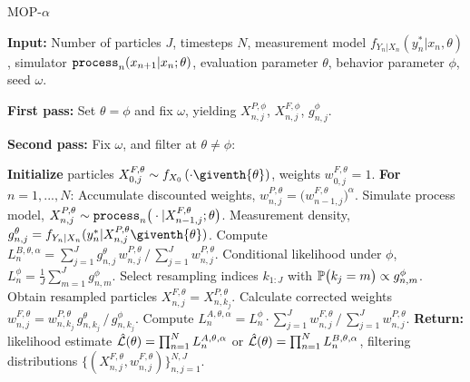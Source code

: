 \documentclass[9pt,twocolumn,pnasresearcharticle]{pnas-new}
\begin{document}
\begin{algorithm}[H]
	\caption{MOP-$\alpha$}
    \label{alg:mop}
	     \textbf{Input:} Number of particles $J$, timesteps $N$, measurement model $f_{Y_n|X_n}(y_n^*|x_n, \theta)$, simulator $\texttt{process}_n(x_{n+1}|x_n; \theta)$, evaluation parameter $\theta$, behavior parameter $\phi$, seed $\omega$.
      
        \textbf{First pass:} Set $\theta=\phi$ and fix $\omega$, yielding $X_{n,j}^{P,\phi}$, $X_{n,j}^{F,\phi}$, $g^{\phi}_{n,j}$.
            
        \textbf{Second pass:}
        Fix $\omega$, and filter at $\theta\neq \phi$:
            
		\textbf{Initialize } particles ${X}_{0,j}^{F,\theta}\sim {f}_{{X}_{0}}\left(\cdot\giventh{\theta}\right)$, weights $w^{F,\theta}_{0,j}= 1$. \newline
		\textbf{For} $n=1,...,N$: \newline
            \hspace*{4mm} Accumulate discounted weights, $w_{n,j}^{P,\theta} = \big(w_{n-1,j}^{F,\theta}\big)^\alpha$.\newline
            \hspace*{4mm} Simulate process model,
            ${X}_{n,j}^{P,\theta}\sim \texttt{process}_n\big(\cdot|{X}_{n-1,j}^{F, \theta};{\theta}\big)$. \newline
            \hspace*{4mm} Measurement density,
            $g^{\theta}_{n,j}={f}_{{Y}_{n}|{X}_{n}}(y_{n}^{*}|{X}_{n,j}^{P,\theta}\giventh{\theta})$. \newline
            \hspace*{4mm} Compute $L_n^{B,\theta,\alpha} ={\sum_{j=1}^Jg^\theta_{n,j} \, w^{P,\theta}_{n,j}}\, \big/\, {\sum_{j=1}^J  w^{P,\theta}_{n,j}}$. \newline
            \hspace*{4mm} Conditional likelihood under $\phi$,
            $L_n^{\phi} = \frac{1}{J}\sum_{m=1}^{J}g^{\phi}_{n,m}$.\newline
            \hspace*{4mm} Select resampling indices $k_{1:J}$ with $\mathbb{P}\big(k_{j}=m\big) \propto g^{\phi}_{n,m}$. \newline
            \hspace*{4mm} Obtain resampled particles ${X}_{n,j}^{F,\theta}={X}_{n,k_{j}}^{P,\theta}$. \newline
            \hspace*{4mm} Calculate corrected weights
            $w_{n,j}^{F,\theta}= w^{P,\theta}_{n,k_j} \, g^{\theta}_{n,k_j} \, \big/ \, { g^{\phi}_{n,k_j}}$.\newline
            \hspace*{4mm} Compute $ L_n^{A,\theta,\alpha} = L_n^\phi\cdot {\sum_{j=1}^J w^{F,\theta}_{n,j}} \, \big/ \, {\sum_{j=1}^J  w^{P,\theta}_{n,j}}$.\newline
		\textbf{Return:} likelihood estimate $\hat{\mathcal{L}}(\theta) = \prod_{n=1}^N L_n^{A,\theta,\alpha}$ or $\hat{\mathcal{L}}(\theta) = \prod_{n=1}^N L_n^{B,\theta,\alpha}$, filtering distributions $\{(X_{n,j}^{F, \theta}, w^{F,\theta}_{n,j})\}_{n,j=1}^{N,J}.$
\end{algorithm}
\end{document}
